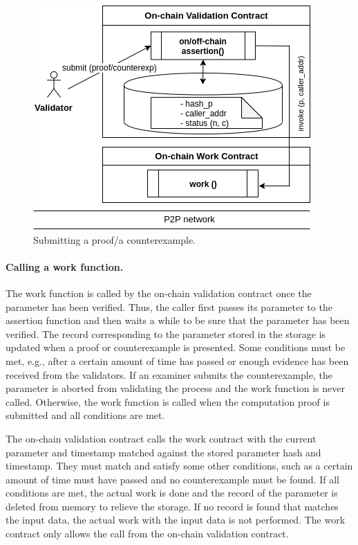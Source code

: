 \documentclass[runningheads]{llncs}
\begin{document}
\begin{figure}
\centering
\includegraphics[scale=.8]{validator}
\caption{Submitting a proof/a counterexample.}
\end{figure}

\paragraph{Calling a work function.}
The work function is called by the on-chain validation contract once the parameter has been verified. Thus, the caller first passes its parameter to the assertion function and then waits a while to be sure that the parameter has been verified. The record corresponding to the parameter stored in the storage is updated when a proof or counterexample is presented. Some conditions must be met, e.g., after a certain amount of time has passed or enough evidence has been received from the validators.
If an examiner submits the counterexample, the parameter is aborted from validating the process and the work function is never called. Otherwise, the work function is called when the computation proof is submitted and all conditions are met. 

 The on-chain validation contract calls the work contract with the current parameter and timestamp matched against the stored parameter hash and timestamp. They must match and satisfy some other conditions, such as a certain amount of time must have passed and no counterexample must be found. If all conditions are met, the actual work is done and the record of the parameter is deleted from memory to relieve the storage. If no record is found that matches the input data, the actual work with the input data is not performed. The work contract only allows the call from the on-chain validation contract.
\end{document}
